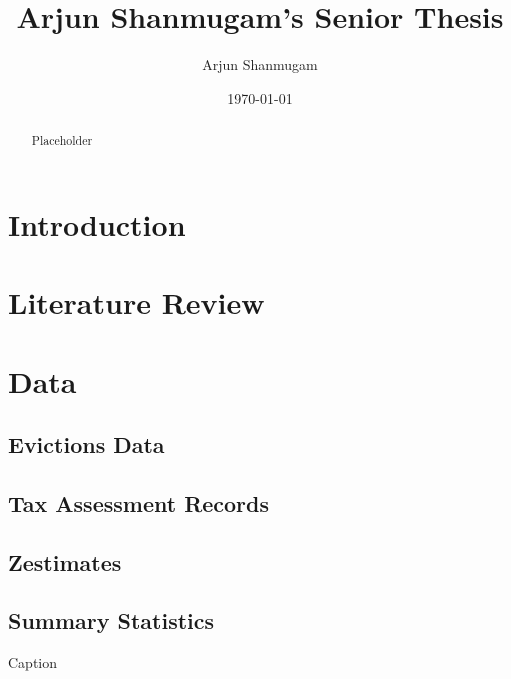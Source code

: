 \documentclass[12pt]{article}
\begin{document}
\begin{titlepage}
\title{Arjun Shanmugam's Senior Thesis}
\author{Arjun Shanmugam}
\date{\today}
\maketitle
\begin{abstract}
\noindent Placeholder\\


\bigskip
\end{abstract}
\setcounter{page}{0}
\thispagestyle{empty}
\end{titlepage}
\pagebreak \newpage




\doublespacing


\section{Introduction} \label{sec:introduction}

\section{Literature Review} \label{sec:literature}

\section{Data} \label{sec:data}
    \subsection{Evictions Data}
    \subsection{Tax Assessment Records}
    \subsection{Zestimates}
    \subsection{Summary Statistics}
    \begin{landscape}
         \begin{table}[H]
            \centering
            
            \caption{Caption}
            \label{tab:my_label}
        \end{table}

    \end{landscape}
       
\end{document}
